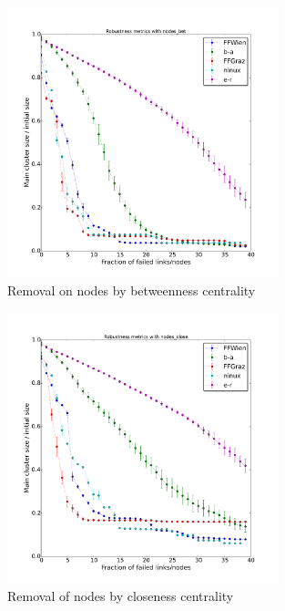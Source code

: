 \documentclass[a4paper,11pt,twoside,openright]{memoir}
\begin{document}
\begin{figure}[htbp]
\centering
\includegraphics[width=0.7\textwidth]{graphs/nodes_bet_robustness}
\caption{Removal on nodes by betweenness centrality}
\label{fig:node_bet}
\end{figure}

\begin{figure}[htbp]
\centering
\includegraphics[width=0.7\textwidth]{graphs/nodes_close_robustness}
\caption{Removal of nodes by closeness centrality}
\label{fig:node_close}
\end{figure}
\end{document}
